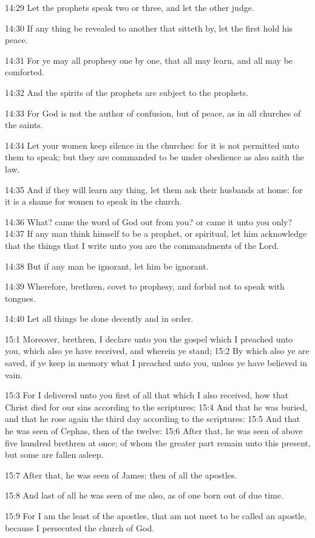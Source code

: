 14:29 Let the prophets speak two or three, and let the other judge.

14:30 If any thing be revealed to another that sitteth by, let the
first hold his peace.

14:31 For ye may all prophesy one by one, that all may learn, and all
may be comforted.

14:32 And the spirits of the prophets are subject to the prophets.

14:33 For God is not the author of confusion, but of peace, as in all
churches of the saints.

14:34 Let your women keep silence in the churches: for it is not
permitted unto them to speak; but they are commanded to be under
obedience as also saith the law.

14:35 And if they will learn any thing, let them ask their husbands at
home: for it is a shame for women to speak in the church.

14:36 What? came the word of God out from you? or came it unto you
only?  14:37 If any man think himself to be a prophet, or spiritual,
let him acknowledge that the things that I write unto you are the
commandments of the Lord.

14:38 But if any man be ignorant, let him be ignorant.

14:39 Wherefore, brethren, covet to prophesy, and forbid not to speak
with tongues.

14:40 Let all things be done decently and in order.

15:1 Moreover, brethren, I declare unto you the gospel which I
preached unto you, which also ye have received, and wherein ye stand;
15:2 By which also ye are saved, if ye keep in memory what I preached
unto you, unless ye have believed in vain.

15:3 For I delivered unto you first of all that which I also received,
how that Christ died for our sins according to the scriptures; 15:4
And that he was buried, and that he rose again the third day according
to the scriptures: 15:5 And that he was seen of Cephas, then of the
twelve: 15:6 After that, he was seen of above five hundred brethren at
once; of whom the greater part remain unto this present, but some are
fallen asleep.

15:7 After that, he was seen of James; then of all the apostles.

15:8 And last of all he was seen of me also, as of one born out of due
time.

15:9 For I am the least of the apostles, that am not meet to be called
an apostle, because I persecuted the church of God.

